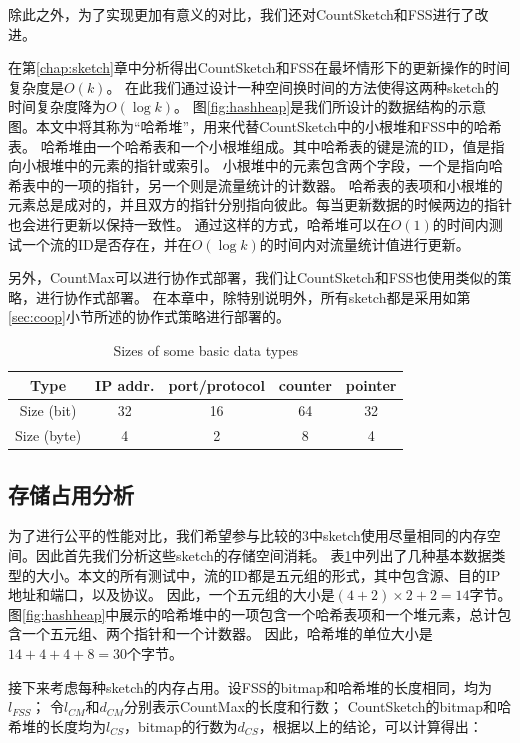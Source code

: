 除此之外，为了实现更加有意义的对比，我们还对CountSketch和FSS进行了改进。

在第\ref{chap:sketch}章中分析得出CountSketch和FSS在最坏情形下的更新操作的时间复杂度是$O(k)$。
在此我们通过设计一种空间换时间的方法使得这两种sketch的时间复杂度降为$O(\log{k})$。
图\ref{fig:hashheap}是我们所设计的数据结构的示意图。本文中将其称为“哈希堆”，用来代替CountSketch中的小根堆和FSS中的哈希表。
哈希堆由一个哈希表和一个小根堆组成。其中哈希表的键是流的ID，值是指向小根堆中的元素的指针或索引。
小根堆中的元素包含两个字段，一个是指向哈希表中的一项的指针，另一个则是流量统计的计数器。
哈希表的表项和小根堆的元素总是成对的，并且双方的指针分别指向彼此。每当更新数据的时候两边的指针也会进行更新以保持一致性。
通过这样的方式，哈希堆可以在$O(1)$的时间内测试一个流的ID是否存在，并在$O(\log{k})$的时间内对流量统计值进行更新。

另外，CountMax可以进行协作式部署，我们让CountSketch和FSS也使用类似的策略，进行协作式部署。
在本章中，除特别说明外，所有sketch都是采用如第\ref{sec:coop}小节所述的协作式策略进行部署的。

\begin{table}[h]
	\centering
	\begin{tabular}{c|c|c|c|c}
		\hline
		Type & IP addr. & port/protocol & counter &pointer\\
		\hline
		Size (bit) & 32 & 16 & 64 & 32\\
		\hline
		Size (byte) & 4 & 2 & 8 & 4\\
		\hline
	\end{tabular}
    \caption{\textnormal{Sizes of some basic data types}}
    \label{tbl:datasize}
\end{table}


\subsection{存储占用分析}

为了进行公平的性能对比，我们希望参与比较的3中sketch使用尽量相同的内存空间。因此首先我们分析这些sketch的存储空间消耗。
表\ref{tbl:datasize}中列出了几种基本数据类型的大小。本文的所有测试中，流的ID都是五元组的形式，其中包含源、目的IP地址和端口，以及协议。
因此，一个五元组的大小是$ (4 + 2 ) \times 2 + 2=14$字节。
图\ref{fig:hashheap}中展示的哈希堆中的一项包含一个哈希表项和一个堆元素，总计包含一个五元组、两个指针和一个计数器。
因此，哈希堆的单位大小是$14+4+4+8=30$个字节。

接下来考虑每种sketch的内存占用。设FSS的bitmap和哈希堆的长度相同，均为$l_{FSS}$；
令$l_{CM}$和$d_{CM}$分别表示CountMax的长度和行数；
CountSketch的bitmap和哈希堆的长度均为$l_{CS}$，bitmap的行数为$d_{CS}$，根据以上的结论，可以计算得出：

